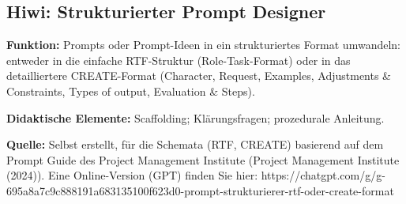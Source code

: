 \documentclass[
  ngerman,
  letterpaper,
  DIV=11]{scrreprt}
\begin{document}
\subsection{Hiwi: Strukturierter Prompt
Designer}\label{sec-prompt-strukturierer}

\textbf{Funktion:} Prompts oder Prompt-Ideen in ein strukturiertes
Format umwandeln: entweder in die einfache RTF-Struktur
(Role-Task-Format) oder in das detailliertere CREATE-Format (Character,
Request, Examples, Adjustments \& Constraints, Types of output,
Evaluation \& Steps).

\textbf{Didaktische Elemente:} Scaffolding; Klärungsfragen; prozedurale
Anleitung.

\textbf{Quelle:} Selbst erstellt, für die Schemata (RTF, CREATE)
basierend auf dem Prompt Guide des Project Management Institute (Project
Management Institute (2024)). Eine Online-Version (GPT) finden Sie hier:
https://chatgpt.com/g/g-695a8a7c9c888191a683135100f623d0-prompt-strukturierer-rtf-oder-create-format
\end{document}
